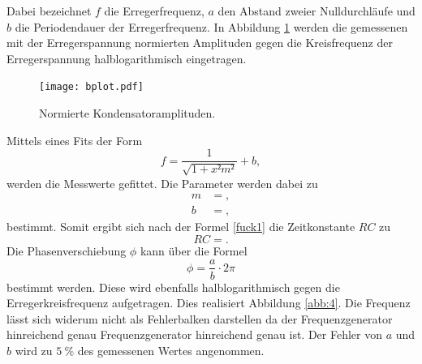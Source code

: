 %
%    
%
Dabei bezeichnet $f$ die Erregerfrequenz, $a$ den Abstand zweier Nulldurchläufe und $b$ die Periodendauer der Erregerfrequenz.
In Abbildung \ref{abb:3} werden die gemessenen mit der Erregerspannung normierten Amplituden gegen die Kreisfrequenz der Erregerspannung halblogarithmisch eingetragen.

\begin{figure}[H]
  \centering
  \texttt{[image: bplot.pdf]}
  \caption{Normierte Kondensatoramplituden.}
  \label{abb:3}
\end{figure}

Mittels eines Fits der Form
\begin{equation}
  f = \frac{1}{\sqrt{1+x²m²}} +b,
\end{equation}
werden die Messwerte gefittet.
Die Parameter werden dabei zu
\begin{align*}
  m &= , \\
  b &= ,
\end{align*}
bestimmt.
Somit ergibt sich nach der Formel \eqref{fuck1} die Zeitkonstante $RC$ zu
\begin{equation}
  RC = .
\end{equation}
Die Phasenverschiebung $\phi$ kann über die Formel
\begin{equation}
  \phi = \frac{a}{b} \cdot 2\pi
\end{equation}
bestimmt werden.
Diese wird ebenfalls halblogarithmisch gegen die Erregerkreisfrequenz aufgetragen.
Dies realisiert Abbildung \ref{abb:4}.
Die Frequenz lässt sich widerum nicht als Fehlerbalken darstellen da der Frequenzgenerator hinreichend genau Frequenzgenerator hinreichend genau ist.
Der Fehler von $a$ und $b$ wird zu $\SI{5}{\percent}$ des gemessenen Wertes angenommen.

